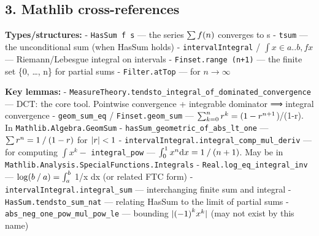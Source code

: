 \documentclass[
]{article}
\begin{document}
\hypertarget{mathlib-cross-references}{%
\subsection{3. Mathlib
cross-references}\label{mathlib-cross-references}}

\textbf{Types/structures:} - \texttt{HasSum\ f\ s} --- the series
\(\sum f\mathopen{\mDelimiter{(}}n\mathclose{\mDelimiter{)}}\) converges
to s - \texttt{tsum} --- the unconditional sum (when HasSum holds) -
\texttt{intervalIntegral} / \(\int x \in a..b, f x\) ---
Riemann/Lebesgue integral on intervals - \texttt{Finset.range\ (n+1)}
--- the finite set \{0, \ldots, n\} for partial sums -
\texttt{Filter.atTop} --- for \(n \to \infty\)

\textbf{Key lemmas:} -
\texttt{MeasureTheory.tendsto\_integral\_of\_dominated\_convergence} ---
DCT: the core tool. Pointwise convergence + integrable dominator ⟹
integral convergence - \texttt{geom\_sum\_eq} /
\texttt{Finset.geom\_sum} ---
\(\sum_{k={\mNumber{0}}}^{n} r^{k} = \mathopen{\mDelimiter{(}}{\mNumber{1}} \mBridgeOperator{-} r^{n+{\mNumber{1}}}\))/(1-r).
In \texttt{Mathlib.Algebra.GeomSum} -
\texttt{hasSum\_geometric\_of\_abs\_lt\_one} ---
\(\sum r^{n} = {\mNumber{1}}\mathbin{\mBridgeOperator{/}}\mathopen{\mDelimiter{(}}{\mNumber{1}}-r\mathclose{\mDelimiter{)}}\)
for \(|r| < {1}\) -
\texttt{intervalIntegral.integral\_comp\_mul\_deriv} --- for computing
\(\int x^{k} -\) \texttt{integral\_pow} ---
\(\int_{{\mNumber{0}}}^{{\mNumber{1}}} x^{n} \mathrm{d}x = {\mNumber{1}}\mathbin{\mBridgeOperator{/}}\mathopen{\mDelimiter{(}}n+{\mNumber{1}}\mathclose{\mDelimiter{)}}\).
May be in \texttt{Mathlib.Analysis.SpecialFunctions.Integrals} -
\texttt{Real.log\_eq\_integral\_inv} ---
\(\log\mathopen{\mDelimiter{(}}b\mathbin{\mBridgeOperator{/}}a\mathclose{\mDelimiter{)}} = \int_{a}^{b}\)
1/x dx (or related FTC form) - \texttt{intervalIntegral.integral\_sum}
--- interchanging finite sum and integral -
\texttt{HasSum.tendsto\_sum\_nat} --- relating HasSum to the limit of
partial sums - \texttt{abs\_neg\_one\_pow\_mul\_pow\_le} --- bounding
\(\mathopen{|}\mathopen{(}-{1}\mathclose{)}^{k}x^{k}\mathclose{|}\)
(may not exist by this name)
\end{document}
